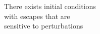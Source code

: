 \documentclass[preview]{standalone}
\begin{document}
There exists initial conditions\\with escapes that are\\sensitive to perturbations\\
\end{document}
